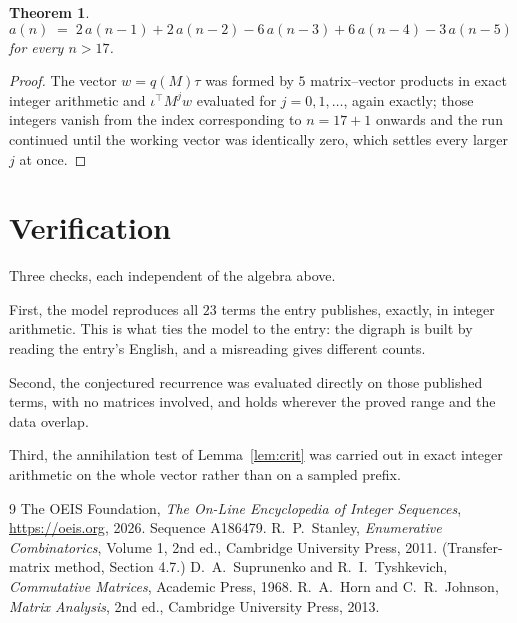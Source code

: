 \documentclass[11pt,a4paper]{article}
\theoremstyle{plain}
\newtheorem{theorem}{Theorem}
\theoremstyle{definition}
\begin{document}
\begin{theorem}
\[
a(n)\;=\;2\,a(n-1) + 2\,a(n-2) - 6\,a(n-3) + 6\,a(n-4) - 3\,a(n-5)
\]
for every $n>17$.
\end{theorem}

\begin{proof}
The vector $w=q(M)\tau$ was formed by $5$ matrix--vector products in exact integer
arithmetic and $\iota^{\!\top}M^{j}w$ evaluated for $j=0,1,\dots$, again exactly; those
integers vanish from the index corresponding to $n=17+1$ onwards and the run continued
until the working vector was identically zero, which settles every larger $j$ at once.
\end{proof}

\section{Verification}

Three checks, each independent of the algebra above.

First, the model reproduces all $23$ terms the entry publishes, exactly, in integer
arithmetic. This is what ties the model to the entry: the digraph is built by reading the
entry's English, and a misreading gives different counts.

Second, the conjectured recurrence was evaluated directly on those published terms, with no
matrices involved, and holds wherever the proved range and the data overlap.

Third, the annihilation test of Lemma~\ref{lem:crit} was carried out in exact integer
arithmetic on the whole vector rather than on a sampled prefix.

\begin{thebibliography}{9}
 The OEIS Foundation, \emph{The On-Line Encyclopedia of Integer
Sequences}, \url{https://oeis.org}, 2026. Sequence A186479.
 R.~P.~Stanley, \emph{Enumerative Combinatorics}, Volume 1, 2nd ed.,
Cambridge University Press, 2011. (Transfer-matrix method, Section 4.7.)
 D.~A.~Suprunenko and R.~I.~Tyshkevich, \emph{Commutative Matrices},
Academic Press, 1968.
 R.~A.~Horn and C.~R.~Johnson, \emph{Matrix Analysis}, 2nd ed., Cambridge
University Press, 2013.
\end{thebibliography}
\end{document}
